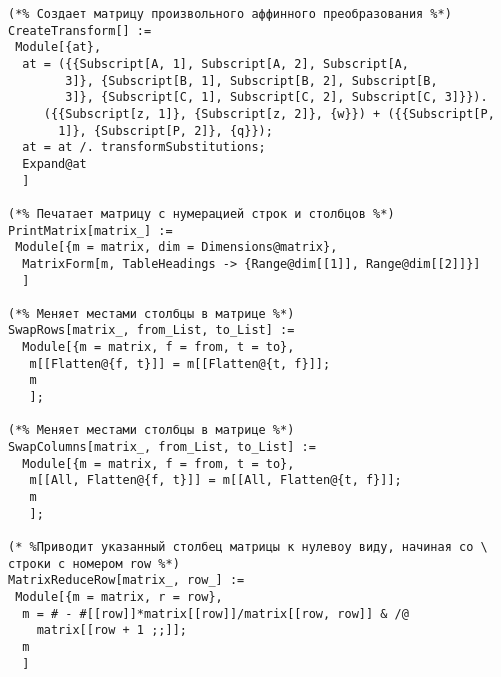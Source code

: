 \documentclass[../main.tex]{subfiles}
\begin{document}
\begin{lstlisting}
(*% Создает матрицу произвольного аффинного преобразования %*)
CreateTransform[] :=
 Module[{at},
  at = ({{Subscript[A, 1], Subscript[A, 2], Subscript[A,
        3]}, {Subscript[B, 1], Subscript[B, 2], Subscript[B,
        3]}, {Subscript[C, 1], Subscript[C, 2], Subscript[C, 3]}}).
     ({{Subscript[z, 1]}, {Subscript[z, 2]}, {w}}) + ({{Subscript[P,
       1]}, {Subscript[P, 2]}, {q}});
  at = at /. transformSubstitutions;
  Expand@at
  ]

(*% Печатает матрицу с нумерацией строк и столбцов %*)
PrintMatrix[matrix_] :=
 Module[{m = matrix, dim = Dimensions@matrix},
  MatrixForm[m, TableHeadings -> {Range@dim[[1]], Range@dim[[2]]}]
  ]

(*% Меняет местами столбцы в матрице %*)
SwapRows[matrix_, from_List, to_List] :=
  Module[{m = matrix, f = from, t = to},
   m[[Flatten@{f, t}]] = m[[Flatten@{t, f}]];
   m
   ];

(*% Меняет местами столбцы в матрице %*)
SwapColumns[matrix_, from_List, to_List] :=
  Module[{m = matrix, f = from, t = to},
   m[[All, Flatten@{f, t}]] = m[[All, Flatten@{t, f}]];
   m
   ];

(* %Приводит указанный столбец матрицы к нулевоу виду, начиная со \
строки с номером row %*)
MatrixReduceRow[matrix_, row_] :=
 Module[{m = matrix, r = row},
  m = # - #[[row]]*matrix[[row]]/matrix[[row, row]] & /@
    matrix[[row + 1 ;;]];
  m
  ]
\end{lstlisting}
\end{document}
